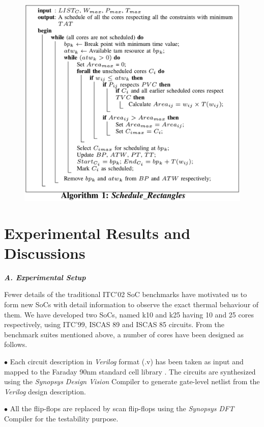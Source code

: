 \documentclass[conference]{IEEEtran}
\begin{document}
\hypertarget{model}{\begin{figure}[ht]
    \center
   \includegraphics[width=\columnwidth]{5.png}
\end{figure}}



\section{Experimental Results and Discussions}

\textbf{\textit{A. Experimental Setup}}
\par
Fewer details of the traditional ITC’02 SoC benchmarks
have motivated us to form new SoCs with detail information
to observe the exact thermal behaviour of them. We have
developed two SoCs, named k10 and k25 having 10 and
25 cores respectively, using ITC’99, ISCAS 89 and ISCAS
85 circuits. From the benchmark suites mentioned above, a
number of cores have been designed as follows.

$\bullet$ Each circuit description in \textit{Verilog} format (.v) has been taken
as input and mapped to the Faraday 90nm standard cell library
\cite{karmakar2016thermal}. The circuits are synthesized using the \textit{Synopsys Design
Vision} Compiler \cite{lettnin2004synthesis} to generate gate-level netlist from the
\textit{Verilog} design description.

$\bullet$ All the flip-flops are replaced by scan flip-flops using the
\textit{Synopsys DFT} Compiler for the testability purpose.
\end{document}
